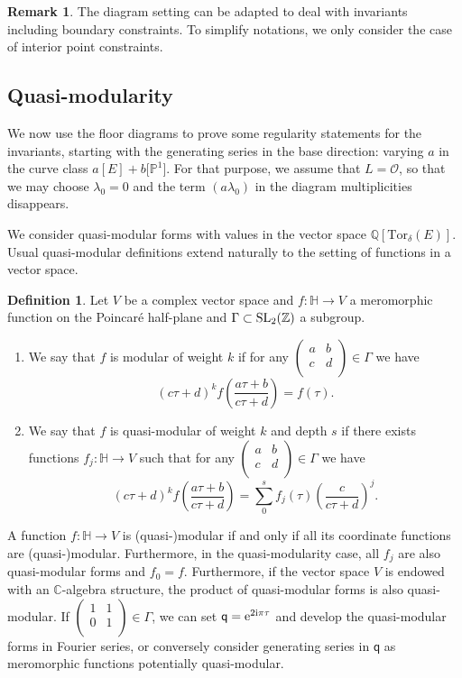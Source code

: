 \documentclass[pdftex]{sigma}
\newcommand{\Tor}{\mathrm{Tor}}
\newcommand{\abcd}{\left(\begin{smallmatrix} a & b \\ c & d \\ \end{smallmatrix}\right)}
\newcommand{\PP}{\mathbb{P}}
\newcommand{\ZZ}{\mathbb{Z}}
\newcommand{\CC}{\mathbb{C}}
\newcommand{\QQ}{\mathbb{Q}}
\newcommand{\HH}{\mathbb{H}}
\newcommand{\sfq}{\mathsf{q}}
\renewcommand{\O}{\mathcal{O}}
\numberwithin{equation}{section}
\theoremstyle{definition}
\newtheorem{defi}[theo]{Definition}
\newtheorem{remarkk}[theo]{Remark}
\begin{document}
\begin{remarkk}
 The diagram setting can be adapted to deal with invariants including boundary constraints. To simplify notations, we only consider the case of interior point constraints.
\end{remarkk}

 \subsection{Quasi-modularity}
 \label{sec-modularity}

We now use the floor diagrams to prove some regularity statements for the invariants, starting with the generating series in the base direction: varying $a$ in the curve class $a[E]+b\big[\PP^1\big]$. For that purpose, we assume that $L=\O$, so that we may choose $\lambda_0=0$ and the term $(a\lambda_0)$ in the diagram multiplicities disappears.

We consider quasi-modular forms with values in the vector space $\QQ[\Tor_\delta(E)]$. Usual quasi-modular definitions extend naturally to the setting of functions in a vector space.

\begin{defi}
 Let $V$ be a complex vector space and $f\colon \HH\to V$ a meromorphic function on the Poincar\'e half-plane and $\Gamma\subset {\rm SL}_2(\ZZ)$ a subgroup.
 \begin{enumerate}\itemsep=0pt
 \item[(1)] We say that $f$ is modular of weight $k$ if for any $\abcd\in \Gamma$ we have
 \[ (c\tau+d)^kf\left(\frac{a\tau+b}{c\tau+d}\right) = f(\tau). \]
 \item[(2)] We say that $f$ is quasi-modular of weight $k$ and depth $s$ if there exists functions $f_j\colon \HH\to V$ such that for any $\abcd\in \Gamma$ we have \[ (c\tau+d)^k f\left(\frac{a\tau+b}{c\tau+d}\right) = \sum_0^s f_j(\tau)\left(\frac{c}{c\tau+d}\right)^j. \]
 \end{enumerate}
\end{defi}

A function $f\colon \HH\to V$ is (quasi-)modular if and only if all its coordinate functions are \mbox{(quasi-)modular}. Furthermore, in the quasi-modularity case, all $f_j$ are also quasi-modular forms and $f_0=f$. Furthermore, if the vector space $V$ is endowed with an $\CC$-algebra structure, the product of quasi-modular forms is also quasi-modular. If $\left(\begin{smallmatrix} 1 & 1 \\ 0 & 1 \\ \end{smallmatrix}\right)\in\Gamma$, we can set $\sfq={\rm e}^{2{\rm i}\pi\tau}$ and develop the quasi-modular forms in Fourier series, or conversely consider generating series in $\sfq$ as meromorphic functions potentially quasi-modular.
\end{document}
